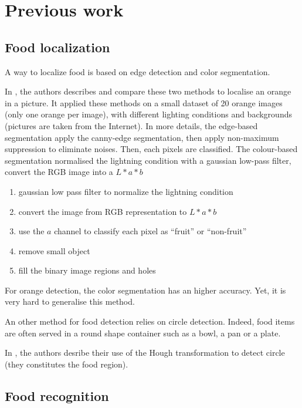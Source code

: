 \chapter{Previous work} \label{sec:previous_work}
\section{Food localization}


A way to localize food is based on edge detection and color segmentation.

In \cite{Thendral2014a}, the authors describes and compare these two methods to localise an orange in a picture. It applied these methods on a small dataset of 20 orange images (only one orange per image), with different lighting conditions and backgrounds (pictures are taken from the Internet).
In more details, the edge-based segmentation apply the canny-edge segmentation, then apply non-maximum suppression to eliminate noises. Then, each pixels are classified.
The colour-based segmentation normalised the lightning condition with a gaussian low-pass filter, convert the RGB image into a $L * a * b$
\begin{enumerate}
    \item gaussian low pass filter to normalize the lightning condition
    \item convert the image from RGB representation to $L * a * b$
    \item use the $a$ channel to classify each pixel as \enquote{fruit} or \enquote{non-fruit}
    \item remove small object
    \item fill the binary image regions and holes
\end{enumerate}
For orange detection, the color segmentation has an higher accuracy. Yet, it is very hard to generalise this method.


An other method for food detection relies on circle detection. Indeed, food items are often served in a round shape container such as a bowl, a pan or a plate.

In \cite{Wazumi2011}, the authors desribe their use of the Hough transformation to detect circle (they constitutes the food region).


\section{Food recognition}

